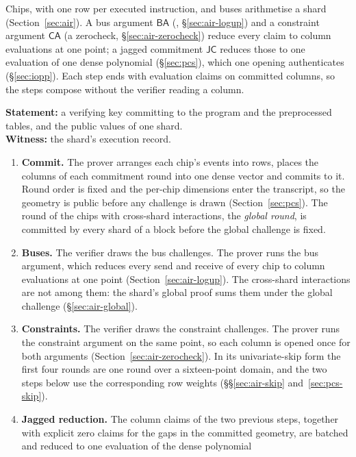 Chips, with one row per executed instruction, and buses arithmetise a shard (Section~\ref{sec:air}). A bus argument $\mathsf{BA}$ (\LogUp{}, \S\ref{sec:air-logup}) and a constraint argument $\mathsf{CA}$ (a zerocheck, \S\ref{sec:air-zerocheck}) reduce every claim to column evaluations at one point; a jagged commitment $\mathsf{JC}$ reduces those to one evaluation of one dense polynomial (\S\ref{sec:pcs}), which one \WHIR{} opening authenticates (\S\ref{sec:iopp}). Each step ends with evaluation claims on committed columns, so the steps compose without the verifier reading a column.

\begin{protocol}
\label{prot:shard}
\textbf{Statement:} a verifying key committing to the program and the
preprocessed tables, and the public values of one shard.\\
\textbf{Witness:} the shard's execution record.
\begin{enumerate}
  \item \textbf{Commit.} The prover arranges each chip's events into rows,
  places the columns of each commitment round into one dense vector and
  commits to it. Round order is fixed and the per-chip dimensions enter the
  transcript, so the geometry is public before any challenge is drawn
  (Section~\ref{sec:pcs}). The round of the chips with cross-shard
  interactions, the \emph{global round}, is committed by every shard of a
  block before the global challenge is fixed.
  \item \textbf{Buses.} The verifier draws the bus challenges. The prover runs
  the bus argument, which reduces every send and receive of every chip to
  column evaluations at one point (Section~\ref{sec:air-logup}). The
  cross-shard interactions are not among them: the shard's global proof
  sums them under the global challenge (\S\ref{sec:air-global}).
  \item \textbf{Constraints.} The verifier draws the constraint challenges. The
  prover runs the constraint argument on the same point, so each column is
  opened once for both arguments (Section~\ref{sec:air-zerocheck}). In its
  univariate-skip form the first four rounds are one round over a sixteen-point
  domain, and the two steps below use the corresponding row weights
  (\S\S\ref{sec:air-skip} and~\ref{sec:pcs-skip}).
  \item \textbf{Jagged reduction.} The column claims of the two previous steps,
  together with explicit zero claims for the gaps in the committed geometry,
  are batched and reduced to one evaluation of the dense polynomial

\end{enumerate}
\end{protocol}
